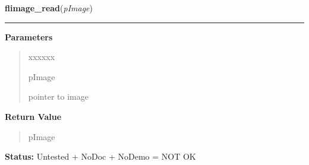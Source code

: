\hspace{.8\funcindent}\begin{boxedminipage}{\funcwidth}

    \raggedright \textbf{flimage\_read}(\textit{pImage})

    \vspace{-1.5ex}

    \rule{\textwidth}{0.5\fboxrule}
\setlength{\parskip}{2ex}
\setlength{\parskip}{1ex}
      \textbf{Parameters}
      \vspace{-1ex}

      \begin{quote}
        \begin{Ventry}{xxxxxx}

          \item[pImage]

          pointer to image

        \end{Ventry}

      \end{quote}

      \textbf{Return Value}
    \vspace{-1ex}

      \begin{quote}
      pImage

      \end{quote}

\textbf{Status:} Untested + NoDoc + NoDemo = NOT OK



    \end{boxedminipage}

    \label{xformslib:flflimage:flimage_dump}

    \vspace{0.5ex}


